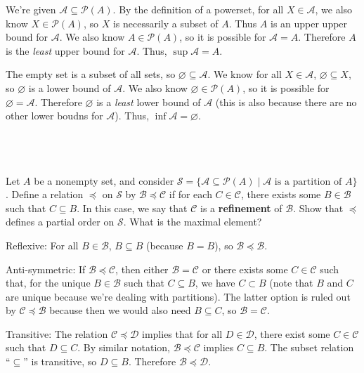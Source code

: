 \documentclass{article}
\begin{document}
We're given $\mathcal{A} \subseteq \mathcal{P}( A)$. By the definition of a powerset, for all $X\in \mathcal{A}$, we also know $X \in \mathcal{P}( A)$, so $X$ is necessarily a subset of $A$. Thus $A$ is an upper upper bound for $\mathcal{A}$. We also know $A\in \mathcal{P}( A)$, so it is possible for $\mathcal{A} =A$. Therefore $A$ is the \textit{least} upper bound for $\mathcal{A}$. Thus, $\sup \mathcal{A} =A$.



The empty set is a subset of all sets, so $\varnothing \subseteq \mathcal{A}$. We know for all $X\in \mathcal{A}$, $\varnothing \subseteq X$, so $\varnothing $ is a lower bound of $\mathcal{A}$. We also know $\varnothing \in \mathcal{P}( A)$, so it is possible for $\varnothing =\mathcal{A}$. Therefore $\varnothing $ is a \textit{least} lower bound of $\mathcal{A}$ (this is also because there are no other lower boudns for $\mathcal{A}$). Thus, $\inf\mathcal{A} =\varnothing $.

\
\hline
\section{}

\begin{problem*}
Let $A$ be a nonempty set, and consider $\mathcal{S}=\{\mathcal{A}\subseteq\mathcal{P}(A)\mid \mathcal{A}\text{ is a partition of }A\}$. Define a relation $\preceq$ on $\mathcal{S}$ by $\mathcal{B}\preceq \mathcal{C}$ if for each $C\in\mathcal{C}$, there exists some $B\in\mathcal{B}$ such that $C\subseteq B$. In this case, we say that $\mathcal{C}$ is a \textbf{refinement} of $\mathcal{B}$. Show that $\preceq$ defines a partial order on $\mathcal{S}$. What is the maximal element? 
\end{problem*}

Reflexive: For all $B\in \mathcal{B}$, $B\subseteq B$ (because $B=B$), so $\mathcal{B} \preceq \mathcal{B}$.

Anti-symmetric: If $\mathcal{B} \preceq \mathcal{C}$, then either $\mathcal{B} =\mathcal{C}$ or there exists some $C\in \mathcal{C}$ such that, for the unique $B\in \mathcal{B}$ such that $C\subseteq B$, we have $C\subset B$ (note that $B$ and $C$ are unique because we're dealing with partitions). The latter option is ruled out by $\mathcal{C\preceq B}$ because then we would also need $B\subseteq C$, so $\mathcal{B} =\mathcal{C}$.

Transitive: The relation $\mathcal{C} \preceq \mathcal{D}$ implies that for all $D\in \mathcal{D}$, there exist some $C\in \mathcal{C}$ such that $D\subseteq C$. By similar notation, $\mathcal{B} \preceq \mathcal{C}$ implies $C\subseteq B$. The subset relation ``$\subseteq $'' is transitive, so $D\subseteq B$. Therefore $\mathcal{B} \preceq \mathcal{D}$.
\end{document}

